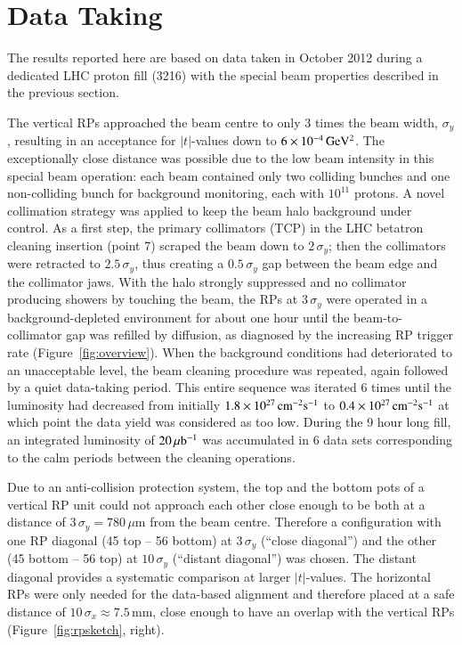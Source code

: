 \section{Data Taking}
\label{sec:data taking}

The results reported here are based on data taken in October 2012 
during a dedicated LHC proton fill (3216)
with the special beam properties described in the previous section.

The vertical RPs approached the beam centre to only 3 times the beam width, $\sigma_{y}$, resulting in an acceptance for $|t|$-values down to $6 \times 10^{-4}\,\rm GeV^{2}$. The exceptionally close distance was possible due to the low beam intensity in this special beam operation: each beam contained only two colliding bunches and one non-colliding bunch for background monitoring, each with $10^{11}$ protons. A novel collimation strategy was applied to keep the beam halo background under control. As a first step, the primary 
collimators (TCP) in the LHC betatron cleaning insertion (point 7) scraped the beam down to $2\,\sigma_{y}$; then the collimators were retracted to $2.5\,\sigma_{y}$, thus creating a $0.5\,\sigma_{y}$ gap between
the beam edge and the collimator jaws. With the halo strongly suppressed 
and no collimator producing showers by touching the beam, the RPs at 
$3\,\sigma_{y}$ were operated in a background-depleted environment for about one 
hour until the beam-to-collimator gap was refilled by diffusion, as 
diagnosed by the increasing RP trigger rate (Figure~\ref{fig:overview}). When the background conditions
had deteriorated to an unacceptable level, the beam cleaning procedure was repeated, again followed by a quiet data-taking period.
This entire sequence was iterated 6 times until the luminosity had decreased 
from initially $1.8\times10^{27}\,\rm cm^{-2}s^{-1}$ to 
$0.4\times10^{27}\,\rm cm^{-2}s^{-1}$
at which point the data yield was considered as too low. 
During the 9 hour long fill, an integrated luminosity of $20\,\rm \mu b^{-1}$ 
was accumulated in 6 data sets corresponding to the calm periods 
between the cleaning operations. 

Due to an anti-collision protection system, the top and the bottom pots of a 
vertical RP unit could not approach each other close enough to be both at a 
distance of $3\,\sigma_{y} = 780\,\mu$m from the beam centre. Therefore a 
configuration with one RP diagonal (45 top -- 56 bottom) at $3\,\sigma_{y}$ (``close diagonal'') and the other (45 bottom -- 56 top) at 
$10\,\sigma_{y}$ (``distant diagonal'') was chosen. The distant diagonal provides a systematic comparison at larger $|t|$-values.
The horizontal RPs were only needed for the data-based alignment and therefore placed at a safe distance of $10\,\sigma_{x} \approx 7.5$\,mm, close enough to have an overlap with the vertical RPs (Figure~\ref{fig:rpsketch}, right).

